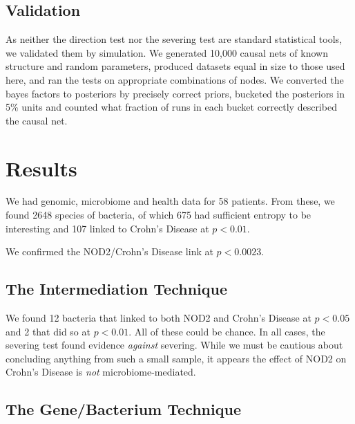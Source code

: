 \documentclass[a4paper]{article}
\begin{document}
\subsection{Validation}

As neither the direction test nor the severing test are standard
statistical tools, we validated them by simulation.  We generated
10,000 causal nets of known structure and random parameters, produced
datasets equal in size to those used here, and ran the tests on
appropriate combinations of nodes.  We converted the bayes factors to
posteriors by precisely correct priors, bucketed the posteriors in 5\%
units and counted what fraction of runs in each bucket correctly
described the causal net.

\section{Results}

We had genomic, microbiome and health data for 58 patients.  From
these, we found 2648 species of bacteria, of which 675 had sufficient
entropy to be interesting and 107 linked to Crohn's Disease at
$p<0.01$.

We confirmed the NOD2/Crohn's Disease link at $p<0.0023$.

\subsection{The Intermediation Technique}

We found 12 bacteria that linked to both NOD2 and Crohn's Disease at
$p<0.05$ and 2 that did so at $p<0.01$.  All of these could be
chance. In all cases, the severing
test found evidence \textit{against} severing.  While we must be
cautious about concluding anything from such a small sample, it
appears the effect of NOD2 on Crohn's Disease is \textit{not}
microbiome-mediated.

\subsection{The Gene/Bacterium Technique}
\end{document}
